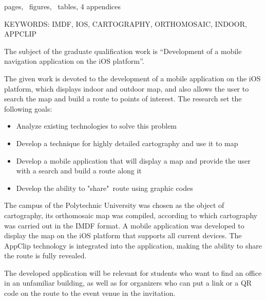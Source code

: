 \noindent \pageref{LastPage} pages, \totalfigures\ figures, \totaltables\ tables, 4 appendices

\MakeUppercase{
  keywords: imdf, ios, cartography, orthomosaic, indoor, appclip
}

The subject of the graduate qualification work is ``Development of a mobile navigation application on the iOS platform''.

The given work is devoted to the development of a mobile application on the iOS platform, which displays indoor and outdoor map, and also allows the user to search the map and build a route to points of interest.
The research set the following goals:
\begin{itemize}
  \item Analyze existing technologies to solve this problem
  \item Develop a technique for highly detailed cartography and use it to map
  \item Develop a mobile application that will display a map and provide the user with a search and build a route along it
  \item Develop the ability to "share"\ route using graphic codes
\end{itemize}

The campus of the Polytechnic University was chosen as the object of cartography, its orthomosaic map was compiled, according to which cartography was carried out in the IMDF format. A mobile application was developed to display the map on the iOS platform that supports all current devices. The AppClip technology is integrated into the application, making the ability to share the route is fully revealed.

The developed application will be relevant for students who want to find an office in an unfamiliar building, as well as for organizers who can put a link or a QR code on the route to the event venue in the invitation.
